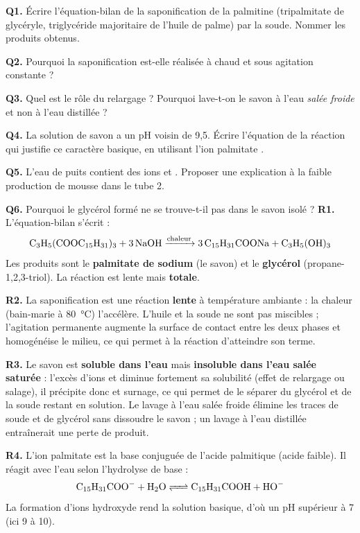 \documentclass[11pt]{article}
\newcommand{\cle}[1]{{\popxbold\color{popdark}#1}}
\begin{document}
\begin{exoresolu}
\textbf{Q1.} Écrire l'équation-bilan de la saponification de la palmitine (tripalmitate de glycéryle, triglycéride majoritaire de l'huile de palme) par la soude. Nommer les produits obtenus.

\textbf{Q2.} Pourquoi la saponification est-elle réalisée à chaud et sous agitation constante ?

\textbf{Q3.} Quel est le rôle du relargage ? Pourquoi lave-t-on le savon à l'eau \emph{salée froide} et non à l'eau distillée ?

\textbf{Q4.} La solution de savon a un pH voisin de 9,5. Écrire l'équation de la réaction qui justifie ce caractère basique, en utilisant l'ion palmitate .

\textbf{Q5.} L'eau de puits contient des ions  et . Proposer une explication à la faible production de mousse dans le tube 2.

\textbf{Q6.} Pourquoi le glycérol formé ne se trouve-t-il pas dans le savon isolé ?
\tcblower
\textbf{R1.} L'équation-bilan s'écrit :
\[ \ce{C3H5(COOC15H31)3 + 3 NaOH ->[chaleur] 3 C15H31COONa + C3H5(OH)3} \]
Les produits sont le \textbf{palmitate de sodium} (le savon) et le \textbf{glycérol} (propane-1,2,3-triol). La réaction est lente mais \textbf{totale}.

\textbf{R2.} La saponification est une réaction \textbf{lente} à température ambiante : la chaleur (bain-marie à \SI{80}{\celsius}) l'accélère. L'huile et la soude ne sont pas miscibles ; l'agitation permanente augmente la surface de contact entre les deux phases et homogénéise le milieu, ce qui permet à la réaction d'atteindre son terme.

\textbf{R3.} Le savon est \textbf{soluble dans l'eau} mais \textbf{insoluble dans l'eau salée saturée} : l'excès d'ions  et  diminue fortement sa solubilité (effet de \cle{relargage} ou \cle{salage}), il précipite donc et surnage, ce qui permet de le séparer du glycérol et de la soude restant en solution. Le lavage à l'eau salée froide élimine les traces de soude et de glycérol sans dissoudre le savon ; un lavage à l'eau distillée entraînerait une perte de produit.

\textbf{R4.} L'ion palmitate est la base conjuguée de l'acide palmitique (acide faible). Il réagit avec l'eau selon l'hydrolyse de base :
\[ \ce{C15H31COO- + H2O <=> C15H31COOH + HO-} \]
La formation d'ions hydroxyde  rend la solution basique, d'où un pH supérieur à 7 (ici 9 à 10).


\end{exoresolu}
\end{document}
